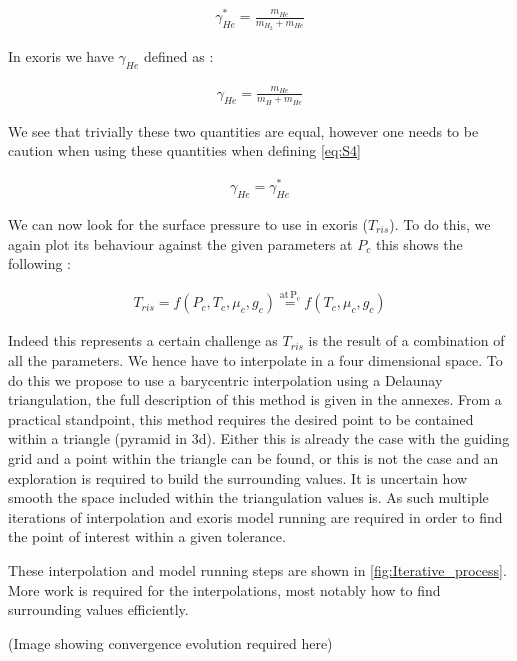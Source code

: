 \begin{align} 
    \gamma_{He}^* = \frac{m_{He}}{m_{H_2}+m_{He}}
\end{align}

In exoris we have  $\gamma_{He}$ defined as :

\begin{align} 
    \gamma_{He} = \frac{m_{He}}{m_{H}+m_{He}}
\end{align}

We see that trivially these two quantities are equal, however one needs to be caution when using these quantities when defining \cref{eq:S4}

\begin{align} 
    \gamma_{He} = \gamma_{He}^*
\end{align}

We can now look for the surface pressure to use in exoris ($T_{ris}$). To do this, we again plot its behaviour against the given parameters at $P_c$ this shows the following :

\begin{align} 
    T_{ris} = f(P_c,T_c,\mu_c,g_c) \overset{\mathrm{at \, P_c}}{=} f(T_c,\mu_c,g_c)
\end{align}

Indeed this represents a certain challenge as $T_{ris}$ is the result of a combination of all the parameters. We hence have to interpolate in a four dimensional space. To do this we propose to use a barycentric interpolation using a Delaunay triangulation, the full description of this method is given in the annexes. From a practical standpoint, this method requires the desired point to be contained within a triangle (pyramid in 3d). Either this is already the case with the guiding grid and a point within the triangle can be found, or this is not the case and an exploration is required to build the surrounding values. It is uncertain how smooth the space included within the triangulation values is. As such multiple iterations of interpolation and exoris model running are required in order to find the point of interest within a given tolerance. \par

These interpolation and model running steps are shown in \cref{fig:Iterative_process}. More work is required for the interpolations, most notably how to find surrounding values efficiently.

(Image showing convergence evolution required here)